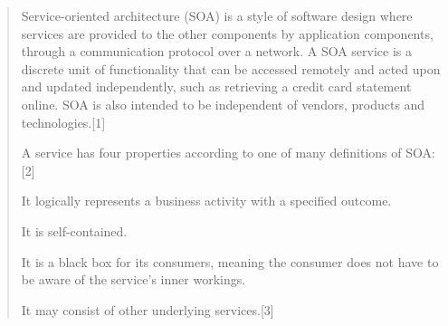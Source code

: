\documentclass[Screen16to9,17pt]{foils}
\begin{document}

\begin{quote}
Service-oriented architecture (SOA) is a style of software design where services are provided to the other components by application components, through a communication protocol over a network. A SOA service is a discrete unit of functionality that can be accessed remotely and acted upon and updated independently, such as retrieving a credit card statement online. SOA is also intended to be independent of vendors, products and technologies.[1]

A service has four properties according to one of many definitions of SOA:[2]
\begin{list2}
\item It logically represents a business activity with a specified outcome.
\item It is self-contained.
\item It is a black box for its consumers, meaning the consumer does not have to be aware of the service's inner workings.
\item It may consist of other underlying services.[3]
\end{list2}
\end{quote}
\end{document}
